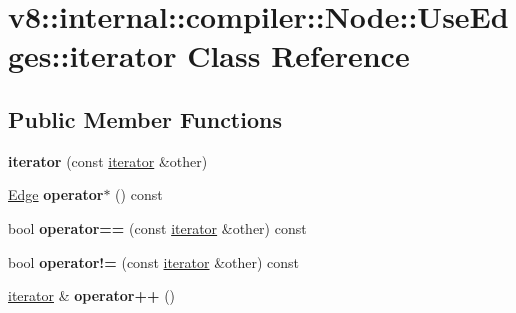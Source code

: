 \hypertarget{classv8_1_1internal_1_1compiler_1_1_node_1_1_use_edges_1_1iterator}{}\section{v8\+:\+:internal\+:\+:compiler\+:\+:Node\+:\+:Use\+Edges\+:\+:iterator Class Reference}
\label{classv8_1_1internal_1_1compiler_1_1_node_1_1_use_edges_1_1iterator}
\subsection*{Public Member Functions}
\begin{DoxyCompactItemize}
\item 
{\bfseries iterator} (const \hyperlink{classv8_1_1internal_1_1compiler_1_1_node_1_1_use_edges_1_1iterator}{iterator} \&other)\hypertarget{classv8_1_1internal_1_1compiler_1_1_node_1_1_use_edges_1_1iterator_abf9fde32b4324ec5f0972dab3b6e0983}{}\label{classv8_1_1internal_1_1compiler_1_1_node_1_1_use_edges_1_1iterator_abf9fde32b4324ec5f0972dab3b6e0983}

\item 
\hyperlink{classv8_1_1internal_1_1compiler_1_1_edge}{Edge} {\bfseries operator$\ast$} () const \hypertarget{classv8_1_1internal_1_1compiler_1_1_node_1_1_use_edges_1_1iterator_a09bbc0057196c68e133fe883409130e9}{}\label{classv8_1_1internal_1_1compiler_1_1_node_1_1_use_edges_1_1iterator_a09bbc0057196c68e133fe883409130e9}

\item 
bool {\bfseries operator==} (const \hyperlink{classv8_1_1internal_1_1compiler_1_1_node_1_1_use_edges_1_1iterator}{iterator} \&other) const \hypertarget{classv8_1_1internal_1_1compiler_1_1_node_1_1_use_edges_1_1iterator_a06e6e7b3d18f5768ac7a0ffcf9b9d3b5}{}\label{classv8_1_1internal_1_1compiler_1_1_node_1_1_use_edges_1_1iterator_a06e6e7b3d18f5768ac7a0ffcf9b9d3b5}

\item 
bool {\bfseries operator!=} (const \hyperlink{classv8_1_1internal_1_1compiler_1_1_node_1_1_use_edges_1_1iterator}{iterator} \&other) const \hypertarget{classv8_1_1internal_1_1compiler_1_1_node_1_1_use_edges_1_1iterator_acbce2470f7d7ff6fb1064c082c18e121}{}\label{classv8_1_1internal_1_1compiler_1_1_node_1_1_use_edges_1_1iterator_acbce2470f7d7ff6fb1064c082c18e121}

\item 
\hyperlink{classv8_1_1internal_1_1compiler_1_1_node_1_1_use_edges_1_1iterator}{iterator} \& {\bfseries operator++} ()\hypertarget{classv8_1_1internal_1_1compiler_1_1_node_1_1_use_edges_1_1iterator_af328d4ca29d42691ae7845625fa42c09}{}\label{classv8_1_1internal_1_1compiler_1_1_node_1_1_use_edges_1_1iterator_af328d4ca29d42691ae7845625fa42c09}


\end{DoxyCompactItemize}
